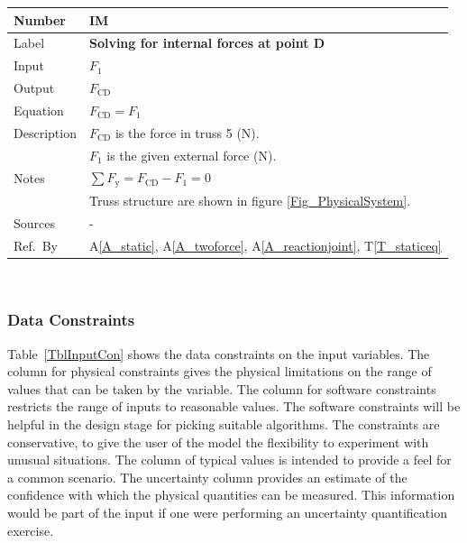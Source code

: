 \documentclass[12pt]{article}
\newcommand{\colAwidth}{0.13\textwidth}
\newcommand{\colBwidth}{0.82\textwidth}
\newcommand{\tref}[1]{T\ref{#1}}
\newcommand{\aref}[1]{A\ref{#1}}
\newcounter{instnum} %
\begin{document}
\noindent
\begin{minipage}{\textwidth}
	\renewcommand*{\arraystretch}{1.5}
	\begin{tabular}{| p{\colAwidth} | p{\colBwidth}|}
		\hline
		\rowcolor[gray]{0.9}
		Number& IM{instnum}\theinstnum \label{I_solveD}\\
		\hline
		Label& \bf Solving for internal forces at point D\\
		\hline
		Input& $F_1$\\
		\hline
		Output& $F_{\text{{CD}}}$ \\
		\hline
		Equation&$F_{\text{{CD}}} = F_1$ \\
		\hline
		Description&$F_{\text{{CD}}}$ is the force in truss 5 (N).\\
		&$F_1$ is the given external force (N).\\
		\hline
		Notes& $\sum F_{\text{y}} = F_{\text{CD}} - F_1 = 0$\\
		&Truss structure are shown in figure \ref{Fig_PhysicalSystem}.\\
		\hline
		Sources& - \\
		\hline
		Ref.\ By & \aref{A_static}, \aref{A_twoforce}, \aref{A_reactionjoint}, 
		\tref{T_staticeq}\\
		\hline
	\end{tabular}
\end{minipage}\\

\subsubsection{Data Constraints} \label{sec_DataConstraints}    

Table~\ref{TblInputCon} shows the data constraints on the input variables.  The 
column for physical constraints gives the physical limitations on the range of 
values that can be taken by the variable. The column for software constraints 
restricts the range of inputs to reasonable values. The software constraints 
will be helpful in the design stage for picking suitable algorithms. The 
constraints are conservative, to give the user of the model the flexibility to 
experiment with unusual situations. The column of typical values is intended to 
provide a feel for a common scenario. The uncertainty column provides an 
estimate of the confidence with which the physical quantities can be measured. 
This information would be part of the input if one were performing an 
uncertainty quantification exercise.
\end{document}
